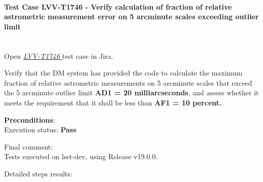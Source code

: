 \documentclass[DM,lsstdraft,STR,toc]{lsstdoc}
\begin{document}
\paragraph{Test Case LVV-T1746 -  Verify calculation of fraction of relative astrometric measurement error
on 5 arcminute scales exceeding outlier limit
 }\mbox{}\\

Open  \href{https://jira.lsstcorp.org/secure/Tests.jspa#/testCase/LVV-T1746}{\textit{ LVV-T1746 } }
test case in Jira.

 Verify that the DM system has provided the code to calculate the maximum
fraction of relative astrometric measurements on 5 arcminute scales that
exceed the 5 arcminute outlier limit \textbf{AD1 = 20 milliarcseconds},
and assess whether it meets the requirement that it shall be less than
\textbf{AF1 = 10 percent.}


\textbf{ Preconditions}:\\


Execution status: {\bf Pass }

Final comment:\\ Tests executed on lsst-dev, using Release v19.0.0.



Detailed steps results:
\end{document}
